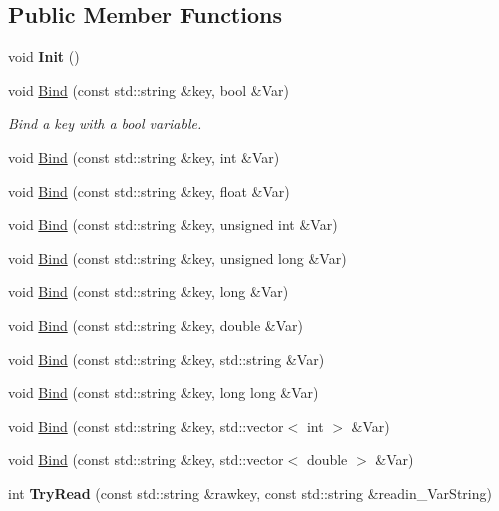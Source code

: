 \subsection*{Public Member Functions}
\begin{DoxyCompactItemize}
\item 
void {\bfseries Init} ()\hypertarget{classParser_a3069965eb5c0eed4f02d63e8e8d47423}{}\label{classParser_a3069965eb5c0eed4f02d63e8e8d47423}

\item 
void \hyperlink{classParser_a5042cdca6bcf677d6bc06217df9dd42b}{Bind} (const std\+::string \&key, bool \&Var)
\begin{DoxyCompactList}\small\item\em Bind a key with a bool variable. \end{DoxyCompactList}\item 
void \hyperlink{classParser_a70da33e59fbb74db75b2d919079281e1}{Bind} (const std\+::string \&key, int \&Var)
\item 
void \hyperlink{classParser_a39b5ff2fea44aeef70cfef20a68c597d}{Bind} (const std\+::string \&key, float \&Var)
\item 
void \hyperlink{classParser_a3b87fe10ae02a5c5a383b1f229257c4b}{Bind} (const std\+::string \&key, unsigned int \&Var)
\item 
void \hyperlink{classParser_a5d433020290f39f62361c52de6c5baf1}{Bind} (const std\+::string \&key, unsigned long \&Var)
\item 
void \hyperlink{classParser_ae0cb89794f25074b4ed03e4aa10f8388}{Bind} (const std\+::string \&key, long \&Var)
\item 
void \hyperlink{classParser_a3ad7875f82b7f9f532477bd44176afac}{Bind} (const std\+::string \&key, double \&Var)
\item 
void \hyperlink{classParser_a11369b4475bcf2d301d78445afa0e89d}{Bind} (const std\+::string \&key, std\+::string \&Var)
\item 
void \hyperlink{classParser_a8440bd87185e06409eb41f578809d8a8}{Bind} (const std\+::string \&key, long long \&Var)
\item 
void \hyperlink{classParser_abb2e4361f66e292bf2ba77ed92929e85}{Bind} (const std\+::string \&key, std\+::vector$<$ int $>$ \&Var)
\item 
void \hyperlink{classParser_a9875593b3872f545e9b6005563c07537}{Bind} (const std\+::string \&key, std\+::vector$<$ double $>$ \&Var)
\item 
int {\bfseries Try\+Read} (const std\+::string \&rawkey, const std\+::string \&readin\+\_\+\+Var\+String)\hypertarget{classParser_aae8ba101202c19cec8472b4ef20e907f}{}\label{classParser_aae8ba101202c19cec8472b4ef20e907f}


\end{DoxyCompactItemize}
